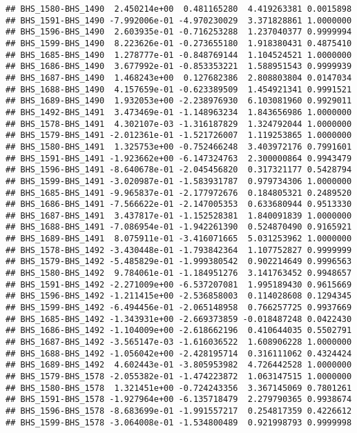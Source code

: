 \documentclass[]{article}
\begin{document}
\begin{verbatim}
## BHS_1580-BHS_1490  2.450214e+00  0.481165280  4.419263381 0.0015898
## BHS_1591-BHS_1490 -7.992006e-01 -4.970230029  3.371828861 1.0000000
## BHS_1596-BHS_1490  2.603935e-01 -0.716253288  1.237040377 0.9999994
## BHS_1599-BHS_1490  8.223626e-01 -0.273655180  1.918380431 0.4875410
## BHS_1685-BHS_1490  1.278777e-01 -0.848769144  1.104524521 1.0000000
## BHS_1686-BHS_1490  3.677992e-01 -0.853353221  1.588951543 0.9999939
## BHS_1687-BHS_1490  1.468243e+00  0.127682386  2.808803804 0.0147034
## BHS_1688-BHS_1490  4.157659e-01 -0.623389509  1.454921341 0.9991521
## BHS_1689-BHS_1490  1.932053e+00 -2.238976930  6.103081960 0.9929011
## BHS_1492-BHS_1491  3.473469e-01 -1.148963234  1.843656986 1.0000000
## BHS_1578-BHS_1491  4.302107e-03 -1.316187829  1.324792044 1.0000000
## BHS_1579-BHS_1491 -2.012361e-01 -1.521726007  1.119253865 1.0000000
## BHS_1580-BHS_1491  1.325753e+00 -0.752466248  3.403972176 0.7991601
## BHS_1591-BHS_1491 -1.923662e+00 -6.147324763  2.300000864 0.9943479
## BHS_1596-BHS_1491 -8.640678e-01 -2.045456820  0.317321177 0.5428794
## BHS_1599-BHS_1491 -3.020987e-01 -1.583931787  0.979734306 1.0000000
## BHS_1685-BHS_1491 -9.965837e-01 -2.177972676  0.184805321 0.2489520
## BHS_1686-BHS_1491 -7.566622e-01 -2.147005353  0.633680944 0.9513330
## BHS_1687-BHS_1491  3.437817e-01 -1.152528381  1.840091839 1.0000000
## BHS_1688-BHS_1491 -7.086954e-01 -1.942261390  0.524870490 0.9165921
## BHS_1689-BHS_1491  8.075911e-01 -3.416071665  5.031253962 1.0000000
## BHS_1578-BHS_1492 -3.430448e-01 -1.793842364  1.107752827 0.9999999
## BHS_1579-BHS_1492 -5.485829e-01 -1.999380542  0.902214649 0.9996563
## BHS_1580-BHS_1492  9.784061e-01 -1.184951276  3.141763452 0.9948657
## BHS_1591-BHS_1492 -2.271009e+00 -6.537207081  1.995189430 0.9615669
## BHS_1596-BHS_1492 -1.211415e+00 -2.536858003  0.114028608 0.1294345
## BHS_1599-BHS_1492 -6.494456e-01 -2.065148958  0.766257725 0.9937669
## BHS_1685-BHS_1492 -1.343931e+00 -2.669373859 -0.018487248 0.0422430
## BHS_1686-BHS_1492 -1.104009e+00 -2.618662196  0.410644035 0.5502791
## BHS_1687-BHS_1492 -3.565147e-03 -1.616036522  1.608906228 1.0000000
## BHS_1688-BHS_1492 -1.056042e+00 -2.428195714  0.316111062 0.4324424
## BHS_1689-BHS_1492  4.602443e-01 -3.805953982  4.726442528 1.0000000
## BHS_1579-BHS_1578 -2.055382e-01 -1.474223872  1.063147515 1.0000000
## BHS_1580-BHS_1578  1.321451e+00 -0.724243356  3.367145069 0.7801261
## BHS_1591-BHS_1578 -1.927964e+00 -6.135718479  2.279790365 0.9938674
## BHS_1596-BHS_1578 -8.683699e-01 -1.991557217  0.254817359 0.4226612
## BHS_1599-BHS_1578 -3.064008e-01 -1.534800489  0.921998793 0.9999998

\end{verbatim}
\end{document}
